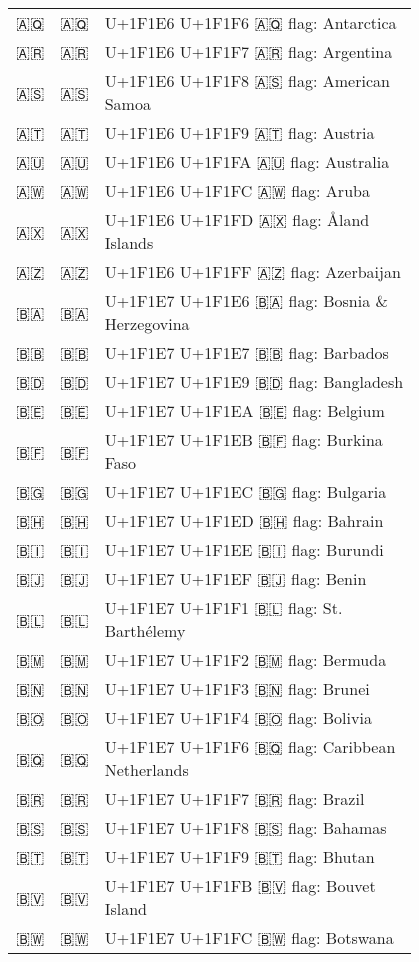 \documentclass[a4paper,12pt]{ltjarticle}
\newcommand{\fontA}[1]{{\fontspec[RawFeature={mode=harf,+dist,+ccmp}]{Segoe UI Emoji} #1}}
\newcommand{\fontB}[1]{{\fontspec[RawFeature={mode=harf,+dist,+ccmp}]{Noto Color Emoji} #1}}
\begin{document}
\begin{longtable}[c]{ccp{0.8\linewidth}}
\fontA{🇦🇶}&\fontB{🇦🇶}&U+1F1E6 U+1F1F6 🇦🇶 flag: Antarctica\\
\fontA{🇦🇷}&\fontB{🇦🇷}&U+1F1E6 U+1F1F7 🇦🇷 flag: Argentina\\
\fontA{🇦🇸}&\fontB{🇦🇸}&U+1F1E6 U+1F1F8 🇦🇸 flag: American Samoa\\
\fontA{🇦🇹}&\fontB{🇦🇹}&U+1F1E6 U+1F1F9 🇦🇹 flag: Austria\\
\fontA{🇦🇺}&\fontB{🇦🇺}&U+1F1E6 U+1F1FA 🇦🇺 flag: Australia\\
\fontA{🇦🇼}&\fontB{🇦🇼}&U+1F1E6 U+1F1FC 🇦🇼 flag: Aruba\\
\fontA{🇦🇽}&\fontB{🇦🇽}&U+1F1E6 U+1F1FD 🇦🇽 flag: Åland Islands\\
\fontA{🇦🇿}&\fontB{🇦🇿}&U+1F1E6 U+1F1FF 🇦🇿 flag: Azerbaijan\\
\fontA{🇧🇦}&\fontB{🇧🇦}&U+1F1E7 U+1F1E6 🇧🇦 flag: Bosnia \& Herzegovina\\
\fontA{🇧🇧}&\fontB{🇧🇧}&U+1F1E7 U+1F1E7 🇧🇧 flag: Barbados\\
\fontA{🇧🇩}&\fontB{🇧🇩}&U+1F1E7 U+1F1E9 🇧🇩 flag: Bangladesh\\
\fontA{🇧🇪}&\fontB{🇧🇪}&U+1F1E7 U+1F1EA 🇧🇪 flag: Belgium\\
\fontA{🇧🇫}&\fontB{🇧🇫}&U+1F1E7 U+1F1EB 🇧🇫 flag: Burkina Faso\\
\fontA{🇧🇬}&\fontB{🇧🇬}&U+1F1E7 U+1F1EC 🇧🇬 flag: Bulgaria\\
\fontA{🇧🇭}&\fontB{🇧🇭}&U+1F1E7 U+1F1ED 🇧🇭 flag: Bahrain\\
\fontA{🇧🇮}&\fontB{🇧🇮}&U+1F1E7 U+1F1EE 🇧🇮 flag: Burundi\\
\fontA{🇧🇯}&\fontB{🇧🇯}&U+1F1E7 U+1F1EF 🇧🇯 flag: Benin\\
\fontA{🇧🇱}&\fontB{🇧🇱}&U+1F1E7 U+1F1F1 🇧🇱 flag: St. Barthélemy\\
\fontA{🇧🇲}&\fontB{🇧🇲}&U+1F1E7 U+1F1F2 🇧🇲 flag: Bermuda\\
\fontA{🇧🇳}&\fontB{🇧🇳}&U+1F1E7 U+1F1F3 🇧🇳 flag: Brunei\\
\fontA{🇧🇴}&\fontB{🇧🇴}&U+1F1E7 U+1F1F4 🇧🇴 flag: Bolivia\\
\fontA{🇧🇶}&\fontB{🇧🇶}&U+1F1E7 U+1F1F6 🇧🇶 flag: Caribbean Netherlands\\
\fontA{🇧🇷}&\fontB{🇧🇷}&U+1F1E7 U+1F1F7 🇧🇷 flag: Brazil\\
\fontA{🇧🇸}&\fontB{🇧🇸}&U+1F1E7 U+1F1F8 🇧🇸 flag: Bahamas\\
\fontA{🇧🇹}&\fontB{🇧🇹}&U+1F1E7 U+1F1F9 🇧🇹 flag: Bhutan\\
\fontA{🇧🇻}&\fontB{🇧🇻}&U+1F1E7 U+1F1FB 🇧🇻 flag: Bouvet Island\\
\fontA{🇧🇼}&\fontB{🇧🇼}&U+1F1E7 U+1F1FC 🇧🇼 flag: Botswana\\

\end{longtable}
\end{document}
